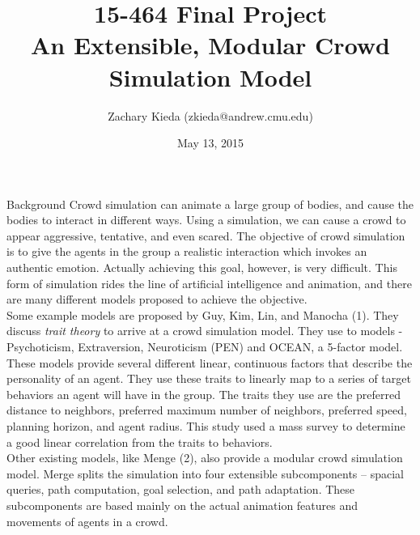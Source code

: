\documentclass[11pt]{article}
\begin{document}
\title{15-464 Final Project\\
{An Extensible, Modular Crowd Simulation Model}}
\author{Zachary Kieda (zkieda@andrew.cmu.edu)}
\date{May 13, 2015}
\maketitle
\begin{section}{Background}
Crowd simulation can animate a large group of bodies, and cause the bodies to interact in different ways. Using a simulation, we can cause a crowd to appear aggressive, tentative, and even scared. The objective of crowd simulation is to give the agents in the group a realistic interaction which invokes an authentic emotion. Actually achieving this goal, however, is very difficult. This form of simulation rides the line of artificial intelligence and animation, and there are many different models proposed to achieve the objective.\\

Some example models are proposed by Guy, Kim, Lin, and Manocha (1). They discuss \emph{trait theory} to arrive at a crowd simulation model. They use to models - Psychoticism, Extraversion, Neuroticism (PEN) and OCEAN, a 5-factor model. These models provide several different linear, continuous factors that describe the personality of an agent. They use these traits to linearly map to a series of target behaviors an agent will have in the group. The traits they use are the preferred distance to neighbors, preferred maximum number of neighbors, preferred speed, planning horizon, and agent radius. This study used a mass survey to determine a good linear correlation from the traits to behaviors.\\

Other existing models, like Menge (2), also provide a modular crowd simulation model. Merge splits the simulation into four extensible subcomponents -- spacial queries, path computation, goal selection, and path adaptation. These subcomponents are based mainly on the actual animation features and movements of agents in a crowd. \\


\end{section}
\end{document}
